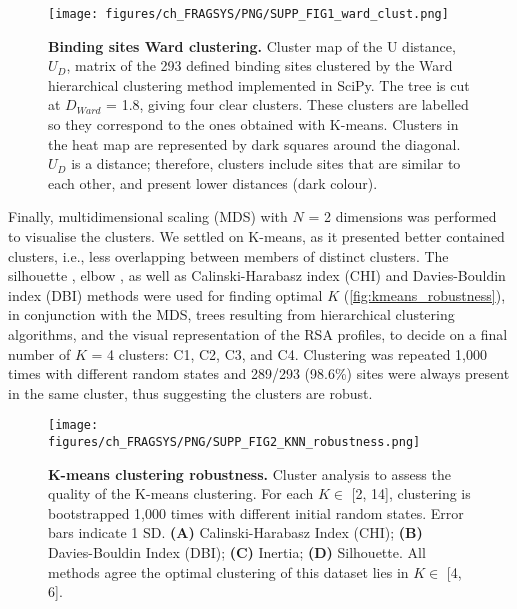 \begin{figure}[ht!]
    \centering
    \texttt{[image: figures/ch\_FRAGSYS/PNG/SUPP\_FIG1\_ward\_clust.png]}
    \caption[Binding sites Ward clustering]{\textbf{Binding sites Ward clustering.} Cluster map of the U distance, $U_{D}$, matrix of the 293 defined binding sites clustered by the Ward hierarchical clustering method implemented in SciPy. The tree is cut at $D_{Ward}$ = 1.8, giving four clear clusters. These clusters are labelled so they correspond to the ones obtained with K-means. Clusters in the heat map are represented by dark squares around the diagonal. $U_{D}$ is a distance; therefore, clusters include sites that are similar to each other, and present lower distances (dark colour).}
    \label{fig:fragsys_bs_clust_ward}
\end{figure}

Finally, multidimensional scaling (MDS) \cite{MEAD_1992_MDS} with $N$ = 2 dimensions was performed to visualise the clusters. We settled on K-means, as it presented better contained clusters, i.e., less overlapping between members of distinct clusters. The silhouette \cite{ROUSSEEUW_1987_SILHOUETTES}, elbow \cite{THORNDIKE_1953_ELBOW}, as well as Calinski-Harabasz index (CHI) \cite{CALINSKI_1974_CHI} and Davies-Bouldin index (DBI) \cite{DAVIES_1979_DBI} methods were used for finding optimal $K$ (\autoref{fig:kmeans_robustness}), in conjunction with the MDS, trees resulting from hierarchical clustering algorithms, and the visual representation of the RSA profiles, to decide on a final number of $K$ = 4 clusters: C1, C2, C3, and C4. Clustering was repeated 1,000 times with different random states and 289/293 (98.6\%) sites were always present in the same cluster, thus suggesting the clusters are robust.

\begin{figure}[ht!]
    \centering
    \texttt{[image: figures/ch\_FRAGSYS/PNG/SUPP\_FIG2\_KNN\_robustness.png]}
    \caption[K-means clustering robustness]{\textbf{K-means clustering robustness.} Cluster analysis to assess the quality of the K-means clustering. For each $K \in$ [2, 14], clustering is bootstrapped 1,000 times with different initial random states. Error bars indicate 1 SD. \textbf{(A)} Calinski-Harabasz Index (CHI); \textbf{(B)} Davies-Bouldin Index (DBI); \textbf{(C)} Inertia; \textbf{(D)} Silhouette. All methods agree the optimal clustering of this dataset lies in $K \in$ [4, 6].}
    \label{fig:kmeans_robustness}
\end{figure}


